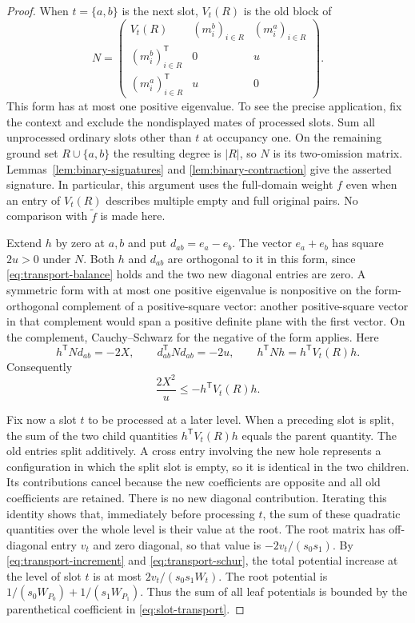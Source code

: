 \begin{proof}
When $t=\{a,b\}$ is the next slot, $V_t(R)$ is the old block of
\[
 N=\begin{pmatrix}
     V_t(R)&(m_i^b)_{i\in R}&(m_i^a)_{i\in R}\\
     (m_i^b)_{i\in R}^{\mathsf T}&0&u\\
     (m_i^a)_{i\in R}^{\mathsf T}&u&0
   \end{pmatrix}.
\]
This form has at most one positive eigenvalue. To see the precise
application, fix the context and exclude the nondisplayed mates of
processed slots. Sum all unprocessed ordinary slots other than $t$
at occupancy one. On the remaining ground set $R\cup\{a,b\}$ the
resulting degree is $|R|$, so $N$ is its two-omission matrix.
Lemmas~\ref{lem:binary-signatures} and
\ref{lem:binary-contraction} give the asserted signature.
In particular, this argument uses the full-domain weight $f$ even
when an entry of $V_t(R)$ describes multiple empty and full original
pairs. No comparison with $\widetilde f$ is made here.

Extend $h$ by zero at $a,b$ and put $d_{ab}=e_a-e_b$.
The vector $e_a+e_b$ has square $2u>0$ under $N$.
Both $h$ and $d_{ab}$ are orthogonal to it in this form, since
\eqref{eq:transport-balance} holds and the two new diagonal entries
are zero. A symmetric form with at most one positive eigenvalue is
nonpositive on the form-orthogonal complement of a positive-square
vector: another positive-square vector in that complement would span
a positive definite plane with the first vector. On the complement,
Cauchy--Schwarz for the negative of the form applies. Here
\[
 h^{\mathsf T}N d_{ab}=-2X,
 \qquad d_{ab}^{\mathsf T}N d_{ab}=-2u,
 \qquad h^{\mathsf T}Nh=h^{\mathsf T}V_t(R)h.
\]
Consequently
\begin{equation}
   \frac{2X^2}{u}\leq -h^{\mathsf T}V_t(R)h.
   \label{eq:transport-schur}
\end{equation}

Fix now a slot $t$ to be processed at a later level.
When a preceding slot is split, the sum of the two child quantities
$h^{\mathsf T}V_t(R)h$ equals the parent quantity.
The old entries split additively. A cross entry involving the new
hole represents a configuration in which the split slot is empty,
so it is identical in the two children. Its contributions cancel
because the new coefficients are opposite and all old coefficients
are retained. There is no new diagonal contribution.
Iterating this identity shows that, immediately before processing
$t$, the sum of these quadratic quantities over the whole level
is their value at the root. The root matrix has off-diagonal entry
$v_t$ and zero diagonal, so that value is
$-2v_t/(s_0s_1)$.
By \eqref{eq:transport-increment} and
\eqref{eq:transport-schur}, the total potential increase at the level
of slot $t$ is at most $2v_t/(s_0s_1W_t)$.
The root potential is
$1/(s_0W_{P_0})+1/(s_1W_{P_1})$.
Thus the sum of all leaf potentials is bounded by the parenthetical
coefficient in \eqref{eq:slot-transport}.


\end{proof}

